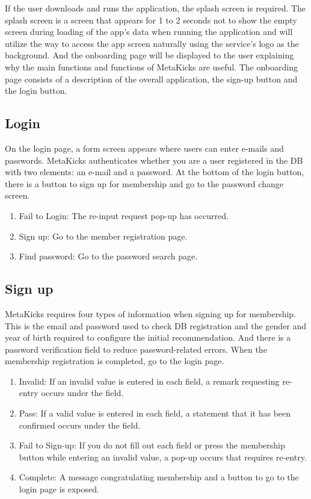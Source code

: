 \documentclass[conference]{IEEEtran}
\begin{document}
If the user downloads and runs the application, the splash screen is required. The splash screen is a screen that appears for 1 to 2 seconds not to show the empty screen during loading of the app's data when running the application and will utilize the way to access the app screen naturally using the service's logo as the background. And the onboarding page will be displayed to the user explaining why the main functions and functions of MetaKicks are useful. The onboarding page consists of a description of the overall application, the sign-up button and the login button.\\

\subsection{Login}
On the login page, a form screen appears where users can enter e-mails and passwords. MetaKicks authenticates whether you are a user registered in the DB with two elements: an e-mail and a password. At the bottom of the login button, there is a button to sign up for membership and go to the password change screen.\\
\begin{enumerate}
    \item Fail to Login: The re-input request pop-up has occurred.\\
    \item Sign up: Go to the member registration page.\\
    \item Find password: Go to the password search page.\\
\end{enumerate}

\subsection{Sign up}
MetaKicks requires four types of information when signing up for membership. This is the email and password used to check DB registration and the gender and year of birth required to configure the initial recommendation. And there is a password verification field to reduce password-related errors. When the membership registration is completed, go to the login page. \\
\begin{enumerate}
    \item Invalid: If an invalid value is entered in each field, a remark requesting re-entry occurs under the field.\\
    \item Pass: If a valid value is entered in each field, a statement that it has been confirmed occurs under the field.\\
    \item Fail to Sign-up: If you do not fill out each field or press the membership button while entering an invalid value, a pop-up occurs that requires re-entry.\\
    \item Complete: A message congratulating membership and a button to go to the login page is exposed.\\
\end{enumerate}
\end{document}
